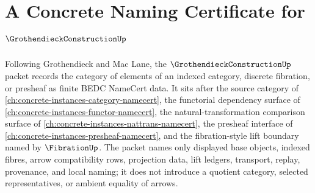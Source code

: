 \chapter{A Concrete Naming Certificate for $\GrothendieckConstructionUp$}
\label{ch:concrete-instances-grothendieck-construction-namecert}

Following Grothendieck and Mac Lane, the $\GrothendieckConstructionUp$ packet records the category of elements of an indexed category, discrete fibration, or presheaf as finite BEDC NameCert data. It sits after the source category of \autoref{ch:concrete-instances-category-namecert}, the functorial dependency surface of \autoref{ch:concrete-instances-functor-namecert}, the natural-transformation comparison surface of \autoref{ch:concrete-instances-nattrans-namecert}, the presheaf interface of \autoref{ch:concrete-instances-presheaf-namecert}, and the fibration-style lift boundary named by $\FibrationUp$. The packet names only displayed base objects, indexed fibres, arrow compatibility rows, projection data, lift ledgers, transport, replay, provenance, and local naming; it does not introduce a quotient category, selected representatives, or ambient equality of arrows.

